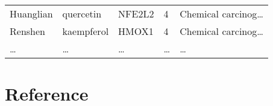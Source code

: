\documentclass[
]{article}
\begin{document}
\begin{longtable}[]{@{}lllll@{}}
\begin{minipage}[t]{0.17\columnwidth}
Huanglian\strut
\end{minipage} & \begin{minipage}[t]{0.16\columnwidth}\raggedright
quercetin\strut
\end{minipage} & \begin{minipage}[t]{0.12\columnwidth}\raggedright
NFE2L2\strut
\end{minipage} & \begin{minipage}[t]{0.19\columnwidth}\raggedright
4\strut
\end{minipage} & \begin{minipage}[t]{0.21\columnwidth}\raggedright
Chemical carcinog\ldots{}\strut
\end{minipage}\tabularnewline
\begin{minipage}[t]{0.17\columnwidth}\raggedright
Renshen\strut
\end{minipage} & \begin{minipage}[t]{0.16\columnwidth}\raggedright
kaempferol\strut
\end{minipage} & \begin{minipage}[t]{0.12\columnwidth}\raggedright
HMOX1\strut
\end{minipage} & \begin{minipage}[t]{0.19\columnwidth}\raggedright
4\strut
\end{minipage} & \begin{minipage}[t]{0.21\columnwidth}\raggedright
Chemical carcinog\ldots{}\strut
\end{minipage}\tabularnewline
\begin{minipage}[t]{0.17\columnwidth}\raggedright
\ldots{}\strut
\end{minipage} & \begin{minipage}[t]{0.16\columnwidth}\raggedright
\ldots{}\strut
\end{minipage} & \begin{minipage}[t]{0.12\columnwidth}\raggedright
\ldots{}\strut
\end{minipage} & \begin{minipage}[t]{0.19\columnwidth}\raggedright
\ldots{}\strut
\end{minipage} & \begin{minipage}[t]{0.21\columnwidth}\raggedright
\ldots{}\strut
\end{minipage}\tabularnewline
\bottomrule
\end{longtable}

\hypertarget{bibliography}{%
\section*{Reference}\label{bibliography}}
\end{document}
